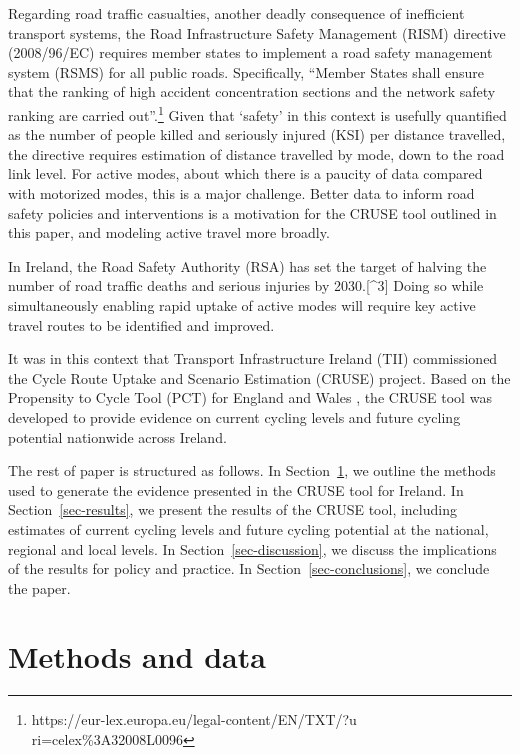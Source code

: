 \documentclass[
  super,
  preprint,
  3p]{elsarticle}
\begin{document}
Regarding road traffic casualties, another deadly consequence of
inefficient transport systems, the Road Infrastructure Safety Management
(RISM) directive (2008/96/EC) requires member states to implement a road
safety management system (RSMS) for all public roads. Specifically,
``Member States shall ensure that the ranking of high accident
concentration sections and the network safety ranking are carried
out''.\footnote{https://eur-lex.europa.eu/legal-content/EN/TXT/?u
  ri=celex\%3A32008L0096} Given that `safety' in this context is
usefully quantified as the number of people killed and seriously injured
(KSI) per distance travelled, the directive requires estimation of
distance travelled by mode, down to the road link level. For active
modes, about which there is a paucity of data compared with motorized
modes, this is a major challenge. Better data to inform road safety
policies and interventions is a motivation for the CRUSE tool outlined
in this paper, and modeling active travel more broadly.

In Ireland, the Road Safety Authority (RSA) has set the target of
halving the number of road traffic deaths and serious injuries by
2030.{[}\^{}3{]} Doing so while simultaneously enabling rapid uptake of
active modes will require key active travel routes to be identified and
improved.

It was in this context that Transport Infrastructure Ireland (TII)
commissioned the Cycle Route Uptake and Scenario Estimation (CRUSE)
project. Based on the Propensity to Cycle Tool (PCT) for England and
Wales \citep{lovelace2017}, the CRUSE tool was developed to provide
evidence on current cycling levels and future cycling potential
nationwide across Ireland.

The rest of paper is structured as follows. In
Section~\ref{sec-methods}, we outline the methods used to generate the
evidence presented in the CRUSE tool for Ireland. In
Section~\ref{sec-results}, we present the results of the CRUSE tool,
including estimates of current cycling levels and future cycling
potential at the national, regional and local levels. In
Section~\ref{sec-discussion}, we discuss the implications of the results
for policy and practice. In Section~\ref{sec-conclusions}, we conclude
the paper.

\hypertarget{sec-methods}{%
\section{Methods and data}\label{sec-methods}}
\end{document}
